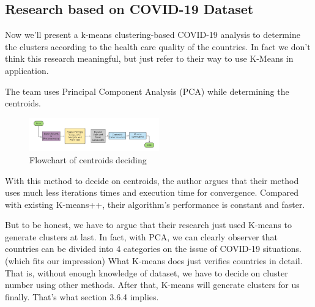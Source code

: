\documentclass[11pt]{article}
\begin{document}
\subsection{Research based on COVID-19 Dataset}
Now we'll present a k-means clustering-based COVID-19 analysis to determine the clusters according to the health care quality of the countries. In fact we don't think this research meaningful, but just refer to their way to use K-Means in application.\cite{zubair2020efficient} \par
The team uses Principal Component Analysis (PCA)  while determining the centroids.
\begin{figure}[H] %
  \centering %
  \includegraphics[width=0.5\textwidth]{COVID19.png} %
  \caption{Flowchart of centroids deciding} %
  \label{Fig.centroids} %
\end{figure}
With this method to decide on centroids, the author argues that their method uses much less iterations times and execution time for convergence. Compared with existing K-means++, their algorithm's performance is constant and faster. \par
But to be honest, we have to argue that their research just used K-means to generate clusters at last. In fact, with PCA, we can clearly observer that countries can be divided into 4 categories on the issue of COVID-19 situations.(which fits our impression) What K-means does just verifies countries in detail. That is, without enough knowledge of dataset, we have to decide on cluster number using other methods. After that, K-means will generate clusters for us finally. That's what section 3.6.4 implies.
\end{document}

